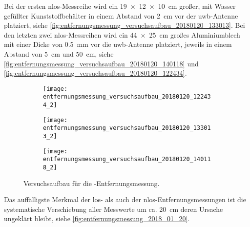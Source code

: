 Bei der ersten \Gls{nlos}-Messreihe wird ein \SI{19x12x10}{\centi\meter} großer, mit Wasser gefüllter Kunststoffbehälter in einem Abstand von \SI{2}{\centi\meter} vor der \Gls{uwb}-Antenne platziert, siehe \autoref{fig:entfernungsmessung_versuchsaufbau_20180120_133013}. Bei den letzten zwei \Gls{nlos}-Messreihen wird ein \SI{44x25}{\centi\meter} großes Aluminiumblech mit einer Dicke von \SI{0.5}{\milli\meter} vor die \Gls{uwb}-Antenne platziert, jeweils in einem Abstand von \SI{5}{\centi\meter} und \SI{50}{\centi\meter}, siehe \autoref{fig:entfernungsmessung_versuchsaufbau_20180120_140118} und \autoref{fig:entfernungsmessung_versuchsaufbau_20180120_122434}.


\begin{figure}[ht]
	\begin{minipage}{0.49\linewidth}
		\begin{subfigure}{\linewidth}
			\texttt{[image: entfernungsmessung\_versuchsaufbau\_20180120\_122434\_2]}
			\caption{ }
			\label{fig:entfernungsmessung_versuchsaufbau_20180120_122434}
		\end{subfigure}
	\end{minipage}
	\hfill
	\begin{minipage}{0.49\linewidth}
			\begin{minipage}{\linewidth}
				\begin{subfigure}{\linewidth}
					\texttt{[image: entfernungsmessung\_versuchsaufbau\_20180120\_133013\_2]}
					\caption{ }
					\label{fig:entfernungsmessung_versuchsaufbau_20180120_133013}
				\end{subfigure}
			\end{minipage}
			\par
			\bigskip
			\begin{minipage}{\linewidth}
				\begin{subfigure}{\linewidth}
					\texttt{[image: entfernungsmessung\_versuchsaufbau\_20180120\_140118\_2]}
					\caption{ }
					\label{fig:entfernungsmessung_versuchsaufbau_20180120_140118}
				\end{subfigure}	
			\end{minipage}
	\end{minipage}
	\caption{Versuchsaufbau für die -Entfernungsmessung.}
	\label{fig:entfernungsmessung_versuchsaufbau_20180120}
\end{figure}


Das auffälligste Merkmal der \Gls{los}- als auch der \Gls{nlos}-Entfernungsmessungen ist die systematische Verschiebung aller Messwerte um ca. \SI{20}{\centi\meter} deren Ursache ungeklärt bleibt, siehe \autoref{fig:entfernungsmessung_2018_01_20}.

